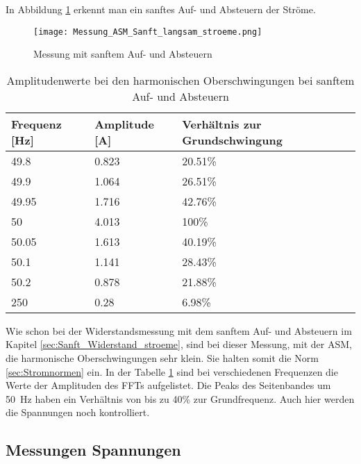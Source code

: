 In Abbildung \ref{fig:Mess_Sanft_langsam_stroeme} erkennt man ein sanftes Auf- und Absteuern der Ströme.

\begin{figure}[ht!]
	\centering
	\texttt{[image: Messung\_ASM\_Sanft\_langsam\_stroeme.png]}	
	\caption{Messung mit sanftem Auf- und Absteuern}\label{fig:Mess_Sanft_langsam_stroeme}
\end{figure}

\begin{table}[ht!]
	\centering
	\begin{tabular}{|l|l|l|}
		\hline
		Frequenz {[}Hz{]} & Amplitude {[}A{]} & Verhältnis zur Grundschwingung	\\ \hline
		49.8              & 0.823             & 20.51\%							\\ \hline
		49.9              & 1.064             & 26.51\%							\\ \hline
		49.95             & 1.716             & 42.76\%							\\ \hline
		50                & 4.013             & 100\%							\\ \hline
		50.05             & 1.613             & 40.19\%							\\ \hline
		50.1              & 1.141             & 28.43\%							\\ \hline
		50.2              & 0.878             & 21.88\%							\\ \hline
		250               & 0.28              & 6.98\%							\\ \hline
	\end{tabular}
	\caption{Amplitudenwerte bei den harmonischen Oberschwingungen bei sanftem Auf- und Absteuern}\label{tab:Sanft_langsam_ASM_stroeme}
\end{table}
Wie schon bei der Widerstandsmessung mit dem sanftem Auf- und Absteuern im Kapitel \ref{sec:Sanft_Widerstand_stroeme}, sind bei dieser Messung, mit der ASM, die harmonische Oberschwingungen sehr klein. Sie halten somit die Norm \ref{sec:Stromnormen} ein. In der Tabelle \ref{tab:Sanft_langsam_ASM_stroeme} sind bei verschiedenen Frequenzen die Werte der Amplituden des FFTs aufgelistet.
Die Peaks des Seitenbandes um \SI{50}{Hz} haben ein Verhältnis von bis zu 40\% zur Grundfrequenz. Auch hier werden die Spannungen noch kontrolliert. 


\newpage
\subsection{Messungen Spannungen}

